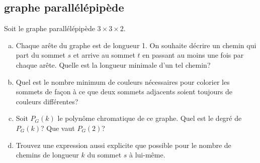 \subsection{graphe parallélépipède}
Soit le graphe parallélépipède $3 \times 3 \times 2$.

\begin{enumerate}[(a)]
  \item Chaque arête du graphe est de longueur 1. On souhaite décrire un chemin qui part du sommet $s$ et arrive au sommet $t$ en passant au moins une fois par chaque arête. Quelle est la longueur minimale d'un tel chemin?
  \item Quel est le nombre minimum de couleurs nécessaires pour colorier les sommets de façon à ce que deux sommets adjacents soient toujours de couleurs différentes?
  \item Soit $P_G(k)$ le polynôme chromatique de ce graphe. Quel est le degré de $P_G(k)$? Que vaut $P_G(2)$?
  \item Trouvez une expression aussi explicite que possible pour le nombre de chemins de longueur $k$ du sommet $s$ à lui-même.
\end{enumerate}
